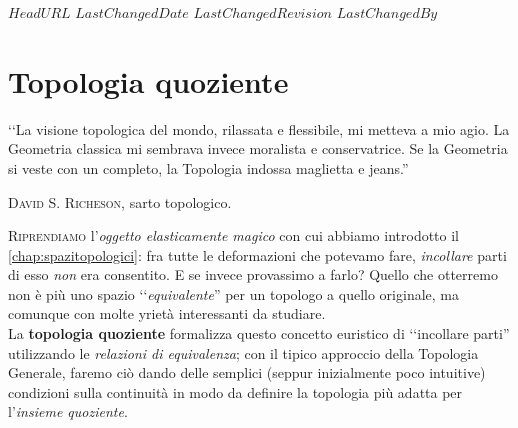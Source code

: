 \svnidlong
{$HeadURL$}
{$LastChangedDate$}
{$LastChangedRevision$}
{$LastChangedBy$}

\chapter{Topologia quoziente}

\begin{introduction}
‘‘La visione topologica del mondo, rilassata e flessibile, mi metteva a mio agio. La Geometria classica mi sembrava invece moralista e conservatrice. Se la Geometria si veste con un completo, la Topologia indossa maglietta e jeans.''
\begin{flushright}
	\textsc{David S. Richeson,} sarto topologico.
\end{flushright}
\end{introduction}
\lettrine[findent=1pt, nindent=0pt]{R}{iprendiamo} l'\textit{oggetto elasticamente magico} con cui abbiamo introdotto il \autoref{chap:spazitopologici}: fra tutte le deformazioni che potevamo fare, \textit{incollare} parti di esso \textit{non} era consentito. E se invece provassimo a farlo? Quello che otterremo non è più uno spazio ‘‘\textit{equivalente}'' per un topologo a quello originale, ma comunque con molte yrietà interessanti da studiare.\\
La \textbf{topologia quoziente} formalizza questo concetto euristico di ‘‘incollare parti'' utilizzando le \textit{relazioni di equivalenza}; con il tipico approccio della Topologia Generale, faremo ciò dando delle semplici (seppur inizialmente poco intuitive) condizioni sulla continuità in modo da definire la topologia più adatta per l'\textit{insieme quoziente}.
